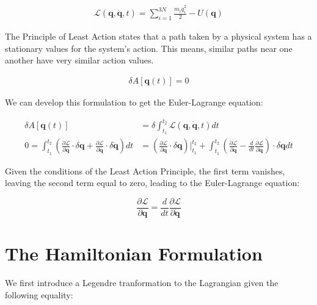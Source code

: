 \documentclass[draft]{agujournal2019}
\begin{document}
\begin{align*}
    \mathcal{L} \left(\mathbf{q}, \dot{\mathbf{q}}, t \right) = \sum_{i = 1}^{3N} \frac{m_i \dot{q}_i^2}{2} - U(\mathbf{q})
\end{align*}

\begin{definition}
    The Principle of Least Action states that a path taken by a physical system has a stationary values for the system's action. This means, similar paths near one another have very similar action values.

\begin{align*}
    \delta A\left[ \mathbf{q}(t) \right] = 0
\end{align*}

We can develop this formulation to get the Euler-Lagrange equation:

\begin{align*}
    \delta A\left[ \mathbf{q}(t) \right] &= \delta \int_{t_1}^{t_2} \mathcal{L}\left(\mathbf{q}, \dot{\mathbf{q}}, t\right) dt \\
    0 = \int_{t_1}^{t_2} \left( \frac{\partial \mathcal{L}}{\partial \mathbf{q}} \cdot \delta \mathbf{q} + \frac{\partial \mathcal{L}}{\partial \dot{\mathbf{q}}} \cdot \delta \dot{\mathbf{q}} \right)dt &= \left( \frac{\partial \mathcal{L}}{\partial \mathbf{q}} \cdot \delta \mathbf{q} \right) \Big\vert_{t_1}^{t_2} + \int_{t_1}^{t_2} \left( \frac{\partial \mathcal{L}}{\partial \mathbf{q}} - \frac{d}{dt} \frac{\partial \mathcal{L}}{\partial \dot{\mathbf{q}}}  \right) \cdot \delta \mathbf{q} dt
\end{align*}

Given the conditions of the Least Action Principle, the first term vanishes, leaving the second term equal to zero, leading to the Euler-Lagrange equation:

\begin{equation}
    \frac{\partial \mathcal{L}}{\partial \mathbf{q}} = \frac{d}{dt} \frac{\partial \mathcal{L}}{\partial \dot{\mathbf{q}}}
\end{equation}

\end{definition}

\section{The Hamiltonian Formulation}

We first introduce a Legendre tranformation to the Lagrangian given the following equality:
\end{document}
